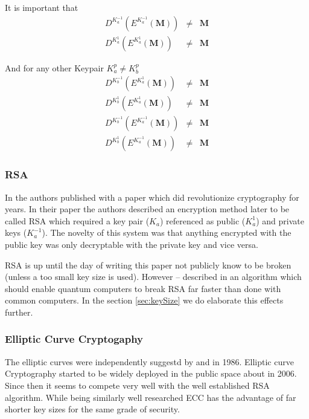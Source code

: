 It is important that 
\begin{eqnarray}
	D^{K^{-1}_a}\left(E^{K^{-1}_a}\left(\mathbf{M}\right)\right) & \neq & \mathbf{M}\\
	D^{K^{1}_a}\left(E^{K^{1}_a}\left(\mathbf{M}\right)\right)   & \neq & \mathbf{M}
\end{eqnarray} 

And for any other Keypair $K^{p}_a \neq K^{p}_b$
\begin{eqnarray}
	D^{K^{-1}_b}\left(E^{K^{1}_a}\left(\mathbf{M}\right)\right)  & \neq & \mathbf{M}\\
	D^{K^{1}_b}\left(E^{K^{1}_a}\left(\mathbf{M}\right)\right)   & \neq & \mathbf{M}\\
	D^{K^{-1}_b}\left(E^{K^{-1}_a}\left(\mathbf{M}\right)\right) & \neq & \mathbf{M}\\
	D^{K^{1}_b}\left(E^{K^{-1}_a}\left(\mathbf{M}\right)\right)  & \neq & \mathbf{M}
\end{eqnarray} 

\subsubsection{RSA}
In \citeyear{Rivest:1978:MOD:359340.359342} the authors \citeauthor{Rivest:1978:MOD:359340.359342} published with \cite{Rivest:1978:MOD:359340.359342} a paper which did revolutionize cryptography for years. In their paper the authors described an encryption method later to be called RSA which required a key pair ($K_a$) referenced as public ($K^{1}_a$) and private keys ($K^{-1}_a$). The novelty of this system was that anything encrypted with the public key was only decryptable with the private key and vice versa.

RSA is up until the day of writing this paper not publicly know to be broken (unless a too small key size is used). However -- \citeauthor{Shor97polynomial-timealgorithms} described in \citeyear{Shor97polynomial-timealgorithms} an algorithm which should enable quantum computers to break RSA far faster than done with common computers. In the section \ref{sec:keySize} we do elaborate this effects further.

\subsubsection{Elliptic Curve Cryptogaphy}
The elliptic curves were independently suggestd by \cite{Miller1986} and \cite{Koblitz04guideto} in 1986. Elliptic curve Cryptography started to be widely deployed in the public space about in 2006. Since then it seems to compete very well with the well established RSA algorithm. While being similarly well researched ECC has the advantage of far shorter key sizes for the same grade of security.

